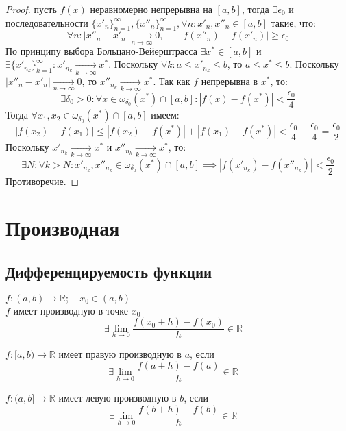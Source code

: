 \begin{proof}
	пусть $f(x)$ неравномерно непрерывна на $[a,b]$, тогда $\exists \epsilon_0$ и последовательности
	$\{x'_n\}_{n=1}^{\infty}, \{x''_n\}_{n=1}^{\infty}, \forall n: x'_n, x''_n \in [a, b]$ такие, что:
	$$\forall n: |x''_n - x'_n| \underset{n \to \infty}{\to} 0, \qquad f(x''_n) - f(x'_n)| \geq \epsilon_0$$
	По принципу выбора Больцано-Вейерштрасса $\exists x^* \in [a,b]$ и $\exists \{x'_{n_k}\}^{\infty}_{k=1}: x'_{n_k} \underset{k \to \infty}{\to} x^*$. Поскольку $\forall k: a \leq x'_{n_k} \leq b$, то $a \leq x^* \leq b$. Поскольку $|x''_n - x'_n| \underset{n \to \infty}{\to} 0$, то
	$x''_{n_k} \underset{k \to \infty}{\to} x^*$. Так как $f$ непрерывна в $x^*$, то:
	$$\exists \delta_0 > 0: \forall x \in \omega_{\delta_0}(x^*) \cap [a, b]: |f(x) - f(x^*)| < \frac{\epsilon_0}{4}$$
	Тогда $\forall x_1, x_2 \in \omega_{\delta_0}(x^*) \cap [a, b]$ имеем:
	$$|f(x_2) - f(x_1)| \leq |f(x_2) - f(x^*)| + |f(x_1) - f(x^*)| < \frac{\epsilon_0}{4} + \frac{\epsilon_0}{4} = \frac{\epsilon_0}{2}$$
	Поскольку $x'_{n_k} \underset{k \to \infty}{\to} x^*$ и $x''_{n_k} \underset{k \to \infty}{\to} x^*$, то:
	$$\exists N: \forall k > N: x'_{n_k}, x''_{n_k} \in \omega_{\delta_0}(x^*) \cap [a, b] \implies |f(x'_{n_k}) - f(x''_{n_k})| < \frac{\epsilon_0}{2}$$
	Противоречие.
\end{proof}


\chapter{Производная}
\section{Дифференцируемость функции}
\begin{definition}
$f: (a,b) \to \mathbb{R}; \quad x_0 \in (a,b)$ \\
$f$ имеет производную в точке  $x_0$
\[
\exists \displaystyle\lim_{h \to 0} \displaystyle\frac{f(x_0+h)-f(x_0)}{h} \in \mathbb{R}\quad 
\]

\end{definition}

\begin{definition}	
$f: [a,b) \to \mathbb{R}$  имеет правую производную в $a$, если
 \[
\exists \displaystyle\lim_{h \to 0} \displaystyle\frac{f(a+h)-f(a)}{h} \in \mathbb{R}\quad 
\] 
	
\end{definition}

\begin{definition}
	$f: (a,b] \to \mathbb{R}$  имеет левую производную в $b$, если
 \[
\exists \displaystyle\lim_{h \to 0} \displaystyle\frac{f(b+h)-f(b)}{h} \in \mathbb{R}\quad 
\] 
\end{definition}


